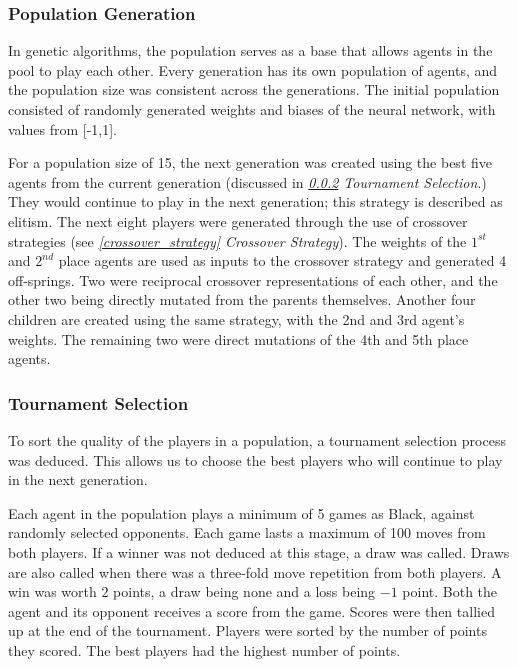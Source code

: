 \documentclass[12pt,a4paper]{article}
\begin{document}
        \subsubsection{Population Generation} \label{population_generation}
            In genetic algorithms, the population serves as a base that allows agents in the pool to play each other. Every generation has its own population of agents, and the population size was consistent across the generations. The initial population consisted of randomly generated weights and biases of the neural network, with values from [-1,1]. 
            
            For a population size of 15, the next generation was created using the best five agents from the current generation (discussed in {\it{\ref{tournament_selection} Tournament Selection}}.) They would continue to play in the next generation; this strategy is described as elitism. The next eight players were generated through the use of crossover strategies (see {\it{\ref{crossover_strategy} Crossover Strategy}}). The weights of the $1^{st}$ and $2^{nd}$ place agents are used as inputs to the crossover strategy and generated 4 off-springs. Two were reciprocal crossover representations of each other, and the other two being directly mutated from the parents themselves. Another four children are created using the same strategy, with the 2nd and 3rd agent's weights. The remaining two were direct mutations of the 4th and 5th place agents.

        \subsubsection{Tournament Selection} \label{tournament_selection}

            To sort the quality of the players in a population, a tournament selection process was deduced. This allows us to choose the best players who will continue to play in the next generation.

            Each agent in the population plays a minimum of 5 games as Black, against randomly selected opponents. Each game lasts a maximum of 100 moves from both players. If a winner was not deduced at this stage, a draw was called. Draws are also called when there was a three-fold move repetition from both players. A win was worth $2$ points, a draw being none and a loss being $-1$ point. Both the agent and its opponent receives a score from the game.
            Scores were then tallied up at the end of the tournament. Players were sorted by the number of points they scored. The best players had the highest number of points.
  
\end{document}
